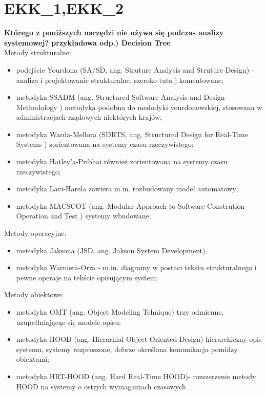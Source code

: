 \section{EKK\_1,EKK\_2}
\textbf{Którego z poniższych narzędzi nie używa się podczas analizy systemowej?
przykładowa odp.) Decision Tree
}\\
Metody strukturalne:
 \begin{itemize}
 \item podejście Yourdona (SA/SD, ang. Struture Analysis and Struture Design) -  analiza i projektowanie strukturalne, szeroko tuta j komentowane;
 \item metodyka SSADM (ang. Structured Software Analysis and Design Methodology )  metodyka podobna do medodyki yourdonowskiej, stosowana w administracjach  rządowych  niektórych krajów;
\item metodyka Warda-Mellora (SDRTS, ang. Structured Design for Real-Time Systems )  zorientowana na systemy czasu rzeczywistego;
\item metodyka Hatley'a-Pribhai  również zorientowana na systemy czasu rzeczywistego;
\item metodyka Lavi-Harela  zawiera m.in. rozbudowany model automatowy;
\item metodyka MACSCOT (ang. Modular Approach to Software Constrution Operation and Test )  systemy wbudowane;
\end{itemize}
Metody operacyjne:
\begin{itemize}
\item  metodyka Jaksona (JSD, ang. Jakson System Development)
\item metodyka Warniera-Orra - m.in. diagramy w postaci tekstu strukturalnego i pewne operaje na tekście opisującym system;
\end{itemize}
Metody obiektowe:
\begin{itemize}
\item  metodyka OMT (ang. Object Modeling Tehnique) trzy odmienne, uzupełłniającąe się modele opisu;
\item metodyka HOOD (ang. Hierarhial Object-Oriented Design)  hierarchiczny opis systemu, systemy rozproszone, dobrze określona komunikacja pomidzy obiektami;
\item metodyka HRT-HOOD (ang. Hard Real-Time HOOD)-  rozszerzenie metody HOOD na systemy o ostrych wymaganiach czasowych 
\end{itemize}

